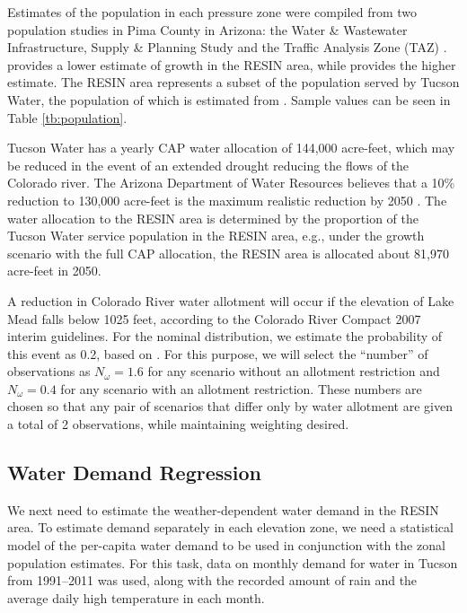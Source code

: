 \documentclass[11pt]{article}
\theoremstyle{plain}
\theoremstyle{definition}
\theoremstyle{remark}
\begin{document}
Estimates of the population in each pressure zone were compiled from two population studies in Pima County in Arizona: the Water \& Wastewater Infrastructure, Supply \& Planning Study \citep{wisp} and the Traffic Analysis Zone (TAZ) \citep{taz}.
\citet{taz} provides a lower estimate of growth in the RESIN area, while \citep{wisp} provides the higher estimate.
The RESIN area represents a subset of the population served by Tucson Water, the population of which is estimated from \citep{tucson}.
Sample values can be seen in Table \ref{tb:population}.

Tucson Water has a yearly CAP water allocation of 144,000 acre-feet, which may be reduced in the event of an extended drought reducing the flows of the Colorado river.
The Arizona Department of Water Resources believes that a 10\% reduction to 130,000 acre-feet is the maximum realistic reduction by 2050 \citep{scott2012scenario}.
The water allocation to the RESIN area is determined by the proportion of the Tucson Water service population in the RESIN area, e.g., under the \citep{wisp} growth scenario with the full CAP allocation, the RESIN area is allocated about 81,970 acre-feet in 2050.

A reduction in Colorado River water allotment will occur if the elevation of Lake Mead falls below 1025 feet, according to the Colorado River Compact 2007 interim guidelines.
For the nominal distribution, we estimate the probability of this event as 0.2, based on \citep{usbor}.
For this purpose, we will select the ``number'' of observations as $N_\omega = 1.6$ for any scenario without an allotment restriction and $N_\omega = 0.4$ for any scenario with an allotment restriction.
These numbers are chosen so that any pair of scenarios that differ only by water allotment are given a total of 2 observations, while maintaining weighting desired.


\subsection{Water Demand Regression}
\label{ssec:demand_regression}

We next need to estimate the weather-dependent water demand in the RESIN area.
To estimate demand separately in each elevation zone, we need a statistical model of the per-capita water demand to be used in conjunction with the zonal population estimates.
For this task, data on monthly demand for water in Tucson from 1991--2011 was used, along with the recorded amount of rain and the average daily high temperature in each month.
\end{document}

